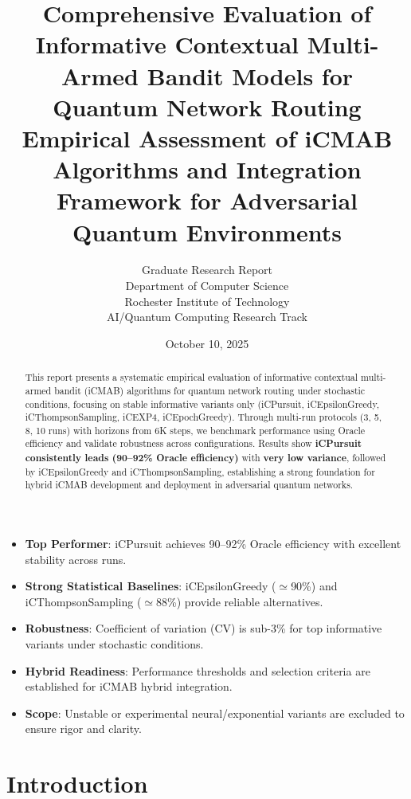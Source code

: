 \documentclass[12pt,a4paper]{article}
\title{\textbf{Comprehensive Evaluation of Informative Contextual Multi-Armed Bandit Models for Quantum Network Routing}\\
\large{Empirical Assessment of iCMAB Algorithms and Integration Framework for Adversarial Quantum Environments}}
\author{Graduate Research Report\\
Department of Computer Science\\
Rochester Institute of Technology\\
AI/Quantum Computing Research Track}
\date{October 10, 2025}
\newcommand{\primarytext}[1]{\textcolor{primaryblue}{\textbf{#1}}}
\newcommand{\secondarytext}[1]{\textcolor{secondaryblue}{\textbf{#1}}}
\newcommand{\success}[1]{\textcolor{accentgreen}{\textbf{#1}}}
\newcommand{\warning}[1]{\textcolor{warningred}{\textbf{#1}}}
\begin{document}
\maketitle

\begin{abstract}
This report presents a systematic empirical evaluation of informative contextual multi-armed bandit (iCMAB) algorithms for quantum network routing under stochastic conditions, focusing on stable informative variants only (iCPursuit, iCEpsilonGreedy, iCThompsonSampling, iCEXP4, iCEpochGreedy). Through multi-run protocols (3, 5, 8, 10 runs) with horizons from 6K steps, we benchmark performance using Oracle efficiency and validate robustness across configurations. Results show \primarytext{iCPursuit consistently leads (90–92\% Oracle efficiency)} with \success{very low variance}, followed by iCEpsilonGreedy and iCThompsonSampling, establishing a strong foundation for hybrid iCMAB development and deployment in adversarial quantum networks.
\end{abstract}

\newpage
\tableofcontents

\newpage

\begin{tcolorbox}[colback=highlightgray,colframe=primaryblue,title=\textbf{Executive Summary}]
\begin{itemize}
\item \primarytext{Top Performer}: iCPursuit achieves 90–92\% Oracle efficiency with excellent stability across runs.
\item \secondarytext{Strong Statistical Baselines}: iCEpsilonGreedy ($\simeq$90\%) and iCThompsonSampling ($\simeq$88\%) provide reliable alternatives.
\item \success{Robustness}: Coefficient of variation (CV) is sub-3\% for top informative variants under stochastic conditions.
\item \primarytext{Hybrid Readiness}: Performance thresholds and selection criteria are established for iCMAB hybrid integration.
\item \warning{Scope}: Unstable or experimental neural/exponential variants are excluded to ensure rigor and clarity.
\end{itemize}
\end{tcolorbox}

\newpage
\section{Introduction}
\end{document}
